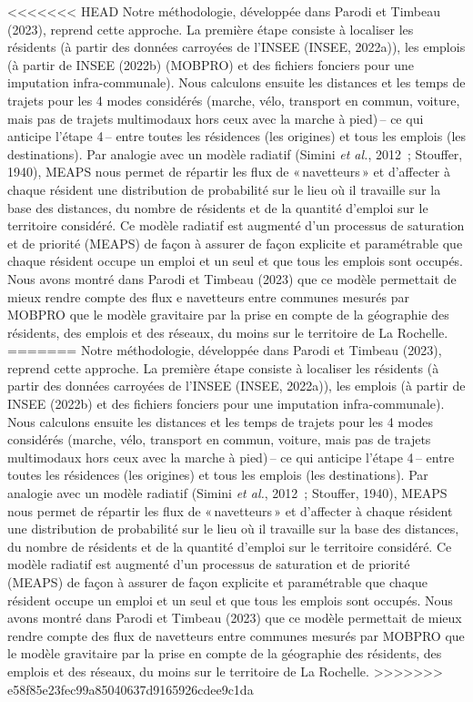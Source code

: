 \documentclass[
  9pt,
  a4paper,
  DIV=11]{scrreprt}
\begin{document}
\textless\textless\textless\textless\textless\textless\textless{} HEAD
Notre méthodologie, développée dans Parodi et Timbeau (2023), reprend
cette approche. La première étape consiste à localiser les résidents (à
partir des données carroyées de l'INSEE (INSEE, 2022a)), les emplois (à
partir de INSEE (2022b) (MOBPRO) et des fichiers fonciers pour une
imputation infra-communale). Nous calculons ensuite les distances et les
temps de trajets pour les 4 modes considérés (marche, vélo, transport en
commun, voiture, mais pas de trajets multimodaux hors ceux avec la
marche à pied)\,-- ce qui anticipe l'étape 4\,-- entre toutes les
résidences (les origines) et tous les emplois (les destinations). Par
analogie avec un modèle radiatif (Simini \emph{et al.}, 2012~; Stouffer,
1940), MEAPS nous permet de répartir les flux de «\,navetteurs\,» et
d'affecter à chaque résident une distribution de probabilité sur le lieu
où il travaille sur la base des distances, du nombre de résidents et de
la quantité d'emploi sur le territoire considéré. Ce modèle radiatif est
augmenté d'un processus de saturation et de priorité (MEAPS) de façon à
assurer de façon explicite et paramétrable que chaque résident occupe un
emploi et un seul et que tous les emplois sont occupés. Nous avons
montré dans Parodi et Timbeau (2023) que ce modèle permettait de mieux
rendre compte des flux e navetteurs entre communes mesurés par MOBPRO
que le modèle gravitaire par la prise en compte de la géographie des
résidents, des emplois et des réseaux, du moins sur le territoire de La
Rochelle. ======= Notre méthodologie, développée dans Parodi et Timbeau
(2023), reprend cette approche. La première étape consiste à localiser
les résidents (à partir des données carroyées de l'INSEE (INSEE,
2022a)), les emplois (à partir de INSEE (2022b) et des fichiers fonciers
pour une imputation infra-communale). Nous calculons ensuite les
distances et les temps de trajets pour les 4 modes considérés (marche,
vélo, transport en commun, voiture, mais pas de trajets multimodaux hors
ceux avec la marche à pied)\,-- ce qui anticipe l'étape 4\,-- entre
toutes les résidences (les origines) et tous les emplois (les
destinations). Par analogie avec un modèle radiatif (Simini \emph{et
al.}, 2012~; Stouffer, 1940), MEAPS nous permet de répartir les flux de
«\,navetteurs\,» et d'affecter à chaque résident une distribution de
probabilité sur le lieu où il travaille sur la base des distances, du
nombre de résidents et de la quantité d'emploi sur le territoire
considéré. Ce modèle radiatif est augmenté d'un processus de saturation
et de priorité (MEAPS) de façon à assurer de façon explicite et
paramétrable que chaque résident occupe un emploi et un seul et que tous
les emplois sont occupés. Nous avons montré dans Parodi et Timbeau
(2023) que ce modèle permettait de mieux rendre compte des flux de
navetteurs entre communes mesurés par MOBPRO que le modèle gravitaire
par la prise en compte de la géographie des résidents, des emplois et
des réseaux, du moins sur le territoire de La Rochelle.
\textgreater\textgreater\textgreater\textgreater\textgreater\textgreater\textgreater{}
e58f85e23fec99a85040637d9165926cdee9c1da
\end{document}
